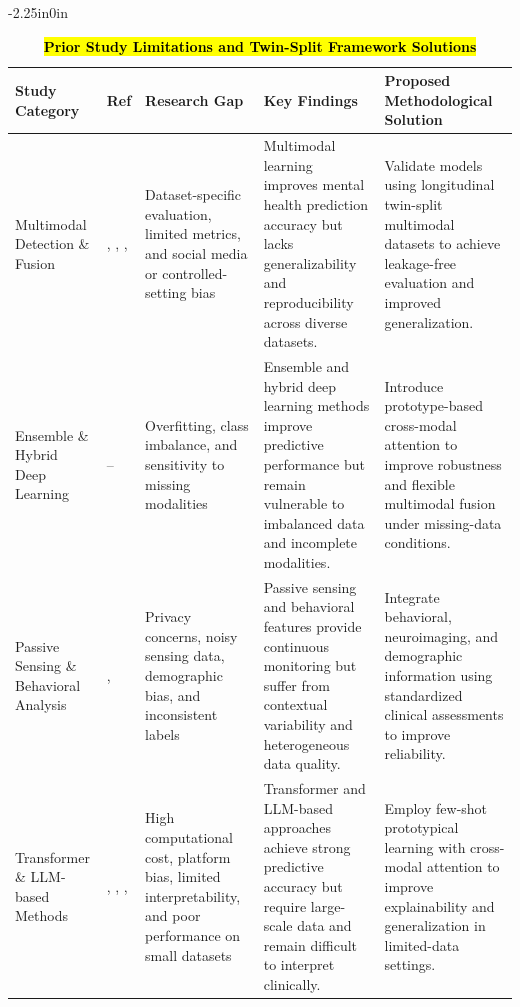 \documentclass[10pt,letterpaper]{article}
\begin{document}
 
\begin{table}[!t]
\begin{adjustwidth}{-2.25in}{0in}
\centering
\caption{\textbf{\hl{Prior Study Limitations and Twin-Split Framework Solutions}}}
\label{tab:prior_limitations}
\footnotesize
\renewcommand{\arraystretch}{1.15}

\begin{tabular}{|p{2.5cm}|p{1.8cm}|p{3.5cm}|p{4.2cm}|p{4.5cm}|}
\hline
\textbf{Study Category} & \textbf{Ref} & \textbf{Research Gap} & \textbf{Key Findings} & \textbf{Proposed Methodological Solution} \\
\hline

Multimodal Detection \& Fusion
& \cite{ref1}, \cite{ref2}, \cite{ref3}, \cite{ref4}
& Dataset-specific evaluation, limited metrics, and social media or controlled-setting bias
& Multimodal learning improves mental health prediction accuracy but lacks generalizability and reproducibility across diverse datasets.
& Validate models using longitudinal twin-split multimodal datasets to achieve leakage-free evaluation and improved generalization. \\
\hline

Ensemble \& Hybrid Deep Learning
& \cite{ref5}--\cite{ref8}
& Overfitting, class imbalance, and sensitivity to missing modalities
& Ensemble and hybrid deep learning methods improve predictive performance but remain vulnerable to imbalanced data and incomplete modalities.
& Introduce prototype-based cross-modal attention to improve robustness and flexible multimodal fusion under missing-data conditions. \\
\hline

Passive Sensing \& Behavioral Analysis
& \cite{ref9}, \cite{ref12}
& Privacy concerns, noisy sensing data, demographic bias, and inconsistent labels
& Passive sensing and behavioral features provide continuous monitoring but suffer from contextual variability and heterogeneous data quality.
& Integrate behavioral, neuroimaging, and demographic information using standardized clinical assessments to improve reliability. \\
\hline

Transformer \& LLM-based Methods
& \cite{ref16}, \cite{ref17}, \cite{ref20}, \cite{ref21}
& High computational cost, platform bias, limited interpretability, and poor performance on small datasets
& Transformer and LLM-based approaches achieve strong predictive accuracy but require large-scale data and remain difficult to interpret clinically.
& Employ few-shot prototypical learning with cross-modal attention to improve explainability and generalization in limited-data settings. \\
\hline


\end{tabular}
\end{adjustwidth}
\end{table}
\end{document}
